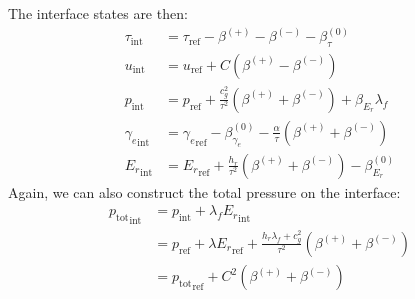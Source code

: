 \documentclass[12pt]{article}
\newcommand{\evm}{{(-)}}
\newcommand{\evz}{{(0)}}
\newcommand{\evp}{{(+)}}
\begin{document}
The interface states are then:
\begin{align}
\tau_\mathrm{int} &= \tau_\mathrm{ref} - \beta^\evp - \beta^\evm - \beta_\tau^\evz \\
u_\mathrm{int} &= u_\mathrm{ref} + C (\beta^\evp - \beta^\evm) \\
p_\mathrm{int} &= p_\mathrm{ref} + \frac{c_g^2}{\tau^2} ( \beta^\evp + \beta^\evm) + \beta_{E_r} \lambda_f \\
{\gamma_e}_\mathrm{int} &= {\gamma_e}_\mathrm{ref} - \beta_{\gamma_e}^\evz 
   - \frac{\alpha}{\tau} (\beta^\evp + \beta^\evm) \\
{E_r}_\mathrm{int} &= {E_r}_\mathrm{ref} + \frac{h_r}{\tau^2} (\beta^\evp + \beta^\evm) - \beta^\evz_{E_r}
\end{align}
Again, we can also construct the total pressure on the interface:
\begin{align}
{p_\mathrm{tot}}_\mathrm{int} &= p_\mathrm{int} + \lambda_f {E_r}_\mathrm{int}\\
    &= p_\mathrm{ref} + \lambda {E_r}_\mathrm{ref} + \frac{h_r \lambda_f + c_g^2}{\tau^2} (\beta^\evp + \beta^\evm) \\
    &= {p_\mathrm{tot}}_\mathrm{ref} + C^2 (\beta^\evp + \beta^\evm)
\end{align}
\end{document}
